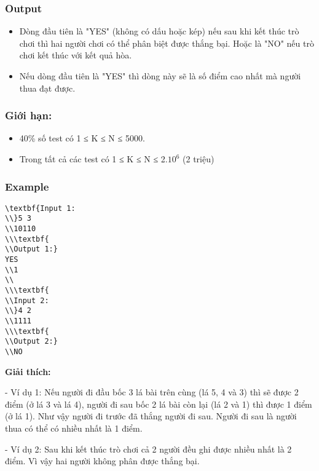 \subsubsection{   Output  }
\begin{itemize}
	\item     Dòng đầu tiên là "YES" (không có dấu hoặc kép) nếu sau khi kết thúc trò chơi thì hai người chơi có thể phân biệt được thắng bại. Hoặc là "NO" nếu trò chơi kết thúc với kết quả hòa.   
	\item     Nếu dòng đầu tiên là "YES" thì dòng này sẽ là số điểm cao nhất mà người         thua        đạt được.   
\end{itemize}

\subsubsection{   Giới hạn:  }
\begin{itemize}
	\item     40\% số test có 1 ≤ K ≤ N ≤ 5000.   
	\item     Trong tất cả các test có 1 ≤ K ≤ N ≤ 2.$10^{6}$    (2 triệu)   
\end{itemize}
\begin{itemize}
\end{itemize}

\subsubsection{   Example  }
\begin{verbatim}
\textbf{Input 1:
\\}5 3
\\10110
\\\textbf{
\\Output 1:}
YES
\\1
\\
\\\textbf{
\\Input 2:
\\}4 2
\\1111
\\\textbf{
\\Output 2:}
\\NO\end{verbatim}

\textbf{    Giải thích:   }

   - Ví dụ 1: Nếu người đi đầu bốc 3 lá bài trên cùng (lá 5, 4 và 3) thì sẽ được 2 điểm (ở lá 3 và lá 4), người đi sau bốc 2 lá bài còn lại (lá 2 và 1) thì được 1 điểm (ở lá 1). Như vậy người đi trước đã thắng người đi sau. Người đi sau là người thua có thể có nhiều nhất là 1 điểm.  

   - Ví dụ 2: Sau khi kết thúc trò chơi cả 2 người đều ghi được nhiều nhất là 2 điểm. Vì vậy hai người không phân được thắng bại.  
